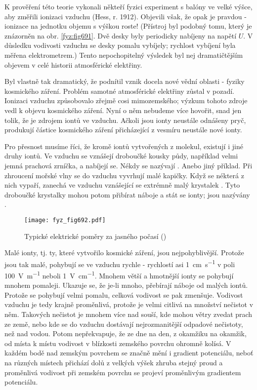     K prověření této teorie vykonali někteří fyzici experiment s balóny ve velké výšce, aby změřili
    ionizaci vzduchu (Hess, r. 1912). Objevili však, že opak je pravdou - ionizace na jednotku
    objemu s výškou roste! (Přístroj byl podobný tomu, který je znázorněn na obr. \ref{fyz:fig691}.
    Dvě desky byly periodicky nabíjeny na napětí \(U\). V důsledku vodivosti vzduchu se desky pomalu
    vybíjely; rychlost vybíjení byla měřena elektrometrem.) Tento nepochopitelný výsledek byl nej
    dramatičtějším objevem v celé historii atmosférické elektřiny.

    Byl vlastně tak dramatický, že podnítil vznik docela nové vědní oblasti - fyziky kosmického
    záření. Problém samotné atmosférické elektřiny zůstal v pozadí. Ionizaci vzduchu způsobovalo
    zřejmě cosi mimozemského; výzkum tohoto zdroje vedl k objevu kosmického záření. Nyní o něm
    nebudeme více hovořit, snad jen tolik, že je zdrojem iontů ve vzduchu. Ačkoli jsou ionty
    neustále odnášeny pryč, produkují částice kosmického záření přicházející z vesmíru neustále nové
    ionty.

    Pro přesnost musíme říci, že kromě iontů vytvořených z molekul, existují i jiné druhy iontů. Ve
    vzduchu se vznášejí droboučké kousky půdy, například velmi jemná prachová zrníčka, a nabíjejí
    se. Nékdy se nazývají . Anebo jiný příklad. Při zhroucení mořské vlny se do vzduchu
    vyvrhují malé kapičky. Když se nékterá z nich vypaří, zanechá ve vzduchu vznášející se extrémně
    malý krystalek . Tyto droboučké krystalky mohou potom přibírat náboje a stát se ionty;
    jsou nazývány .

    \begin{figure}[ht!] %
      \centering
      \texttt{[image: fyz\_fig692.pdf]}
      \caption{Typické elektrické poměry za jasného počasí
               (\cite[s.~707]{Feynman02})}
      \label{fyz:fig692}
    \end{figure}

    Malé ionty, tj. ty, které vytvořilo kosmické záření, jsou nejpohyblivější. Protože jsou tak
    malé, pohybují se ve vzduchu rychle - rychlostí asi \SI{1}{\cm\per\s} v poli \SI{100}{\V\per\m}
    neboli \SI{1}{\V\per\cm}. Mnohem větší a hmotnější ionty se pohybují mnohem pomaleji. Ukazuje
    se, že je-li  mnoho, přebírají náboje od malých iontů. Protože  se
    pohybují velmi pomalu, celková vodivost se pak zmenšuje. Vodivost vzduchu je tedy krajně
    proměnlivá, protože je velmi citlivá na množství nečistot v něm. Takových nečistot je mnohem
    více nad souší, kde mohou větry zvedat prach ze země, nebo kde se do vzduchu dostávají
    nejrozmanitější odpadové nečistoty, než nad vodou. Potom nepřekvapuje, že ze dne na den, z
    okamžiku na okamžik, od místa k místu vodivost v blízkosti zemského povrchu ohromně kolísá. V
    každém bodě nad zemským povrchem se značně mění i gradient potenciálu, neboť na různých místech
    přichází dolů z velkých výšek zhruba stejný proud a proměnlivá vodivost při zemském povrchu se
    projeví proměnlivým gradientem potenciálu.

